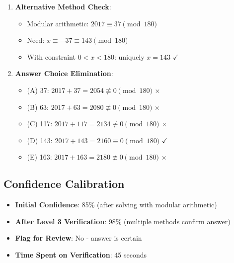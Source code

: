 \documentclass[]{article}
\begin{document}
\begin{verificationbox}
\begin{enumerate}[leftmargin=*]
    \item \textbf{Alternative Method Check}:
    \begin{itemize}
        \item Modular arithmetic: $2017 \equiv 37 \pmod{180}$
        \item Need: $x \equiv -37 \equiv 143 \pmod{180}$
        \item With constraint $0 < x < 180$: uniquely $x = 143$ $\checkmark$
    \end{itemize}
    
    \item \textbf{Answer Choice Elimination}:
    \begin{itemize}
        \item (A) 37: $2017 + 37 = 2054 \not\equiv 0 \pmod{180}$ $\times$
        \item (B) 63: $2017 + 63 = 2080 \not\equiv 0 \pmod{180}$ $\times$
        \item (C) 117: $2017 + 117 = 2134 \not\equiv 0 \pmod{180}$ $\times$
        \item (D) 143: $2017 + 143 = 2160 \equiv 0 \pmod{180}$ $\checkmark$
        \item (E) 163: $2017 + 163 = 2180 \not\equiv 0 \pmod{180}$ $\times$
    \end{itemize}
\end{enumerate}

\subsection*{Confidence Calibration}
\begin{itemize}[leftmargin=*]
    \item \textbf{Initial Confidence}: 85\% (after solving with modular arithmetic)
    \item \textbf{After Level 3 Verification}: 98\% (multiple methods confirm answer)
    \item \textbf{Flag for Review}: No - answer is certain
    \item \textbf{Time Spent on Verification}: 45 seconds
\end{itemize}
\end{verificationbox}
\end{document}
